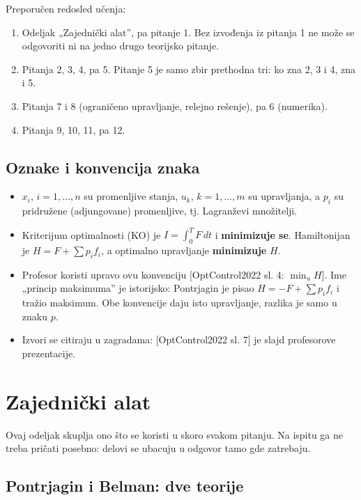\documentclass[11pt,a4paper,parskip=half,headsepline,numbers=noenddot]{scrartcl}
\DeclareRobustCommand{\izvor}[1]{{\small\color{izvorC}[#1]}}
\begin{document}
Preporučen redosled učenja:

\begin{enumerate}
\def\labelenumi{\arabic{enumi}.}
\item Odeljak „Zajednički alat'', pa pitanje 1. Bez izvođenja iz pitanja 1 ne može se odgovoriti ni na jedno drugo teorijsko pitanje.
\item Pitanja 2, 3, 4, pa 5. Pitanje 5 je samo zbir prethodna tri: ko zna 2, 3 i 4, zna i 5.
\item Pitanja 7 i 8 (ograničeno upravljanje, relejno rešenje), pa 6 (numerika).
\item Pitanja 9, 10, 11, pa 12.
\end{enumerate}

\subsection{Oznake i konvencija znaka}

\begin{itemize}
\item \(x_i\), \(i = 1, \dots, n\) su promenljive stanja, \(u_k\), \(k = 1, \dots, m\) su upravljanja, a \(p_i\) su pridružene (adjungovane) promenljive, tj. Lagranževi množitelji.
\item Kriterijum optimalnosti (KO) je \(I = \int_0^T F\,dt\) i \textbf{minimizuje se}. Hamiltonijan je \(H = F + \sum p_i f_i\), a optimalno upravljanje \textbf{minimizuje} \(H\).
\item Profesor koristi upravo ovu konvenciju {[}OptControl2022 sl. 4: \(\min_u H\){]}. Ime „princip maksimuma'' je istorijsko: Pontrjagin je pisao \(H = -F + \sum p_i f_i\) i tražio maksimum. Obe konvencije daju isto upravljanje, razlika je samo u znaku \(p\).
\item Izvori se citiraju u zagradama: \izvor{OptControl2022 sl. 7} je slajd profesorove prezentacije.
\end{itemize}

\section{Zajednički alat}

Ovaj odeljak skuplja ono što se koristi u skoro svakom pitanju. Na ispitu ga ne treba pričati posebno: delovi se ubacuju u odgovor tamo gde zatrebaju.

\subsection{Pontrjagin i Belman: dve teorije}
\end{document}
